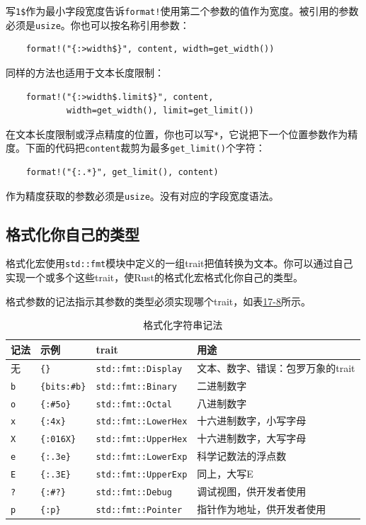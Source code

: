 写\texttt{1\$}作为最小字段宽度告诉\texttt{format!}使用第二个参数的值作为宽度。被引用的参数必须是\texttt{usize}。你也可以按名称引用参数：
\begin{verbatim}
    format!("{:>width$}", content, width=get_width())
\end{verbatim}

同样的方法也适用于文本长度限制：
\begin{verbatim}
    format!("{:>width$.limit$}", content,
            width=get_width(), limit=get_limit())
\end{verbatim}

在文本长度限制或浮点精度的位置，你也可以写\texttt{*}，它说把下一个位置参数作为精度。下面的代码把\texttt{content}裁剪为最多\texttt{get\_limit()}个字符：
\begin{verbatim}
    format!("{:.*}", get_limit(), content)
\end{verbatim}

作为精度获取的参数必须是\texttt{usize}。没有对应的字段宽度语法。

\subsection{格式化你自己的类型}\label{FmtOwnTypes}

格式化宏使用\texttt{std::fmt}模块中定义的一组trait把值转换为文本。你可以通过自己实现一个或多个这些trait，使Rust的格式化宏格式化你自己的类型。

格式参数的记法指示其参数的类型必须实现哪个trait，如表\hyperref[t17-8]{17-8}所示。

\begin{longtable}{p{}p{}p{}p{}}
    \caption{格式化字符串记法}
    \label{t17-8}\\
    \hline
    \textbf{记法} & \textbf{示例} & \textbf{trait} & \textbf{用途} \\
    \hline
    无 & \texttt{\{\}} & \texttt{std::fmt::Display} & 文本、数字、错误：包罗万象的trait \\
    \rowcolor{tablecolor}
    \texttt{b} & \texttt{\{bits:\#b\}} & \texttt{std::fmt::Binary} & 二进制数字 \\
    \texttt{o} & \texttt{\{:\#5o\}} & \texttt{std::fmt::Octal} & 八进制数字 \\
    \rowcolor{tablecolor}
    \texttt{x} & \texttt{\{:4x\}} & \texttt{std::fmt::LowerHex} & 十六进制数字，小写字母 \\
    \texttt{X} & \texttt{\{:016X\}} & \texttt{std::fmt::UpperHex} & 十六进制数字，大写字母 \\
    \rowcolor{tablecolor}
    \texttt{e} & \texttt{\{:.3e\}} & \texttt{std::fmt::LowerExp} & 科学记数法的浮点数 \\
    \texttt{E} & \texttt{\{:.3E\}} & \texttt{std::fmt::UpperExp} & 同上，大写E \\
    \rowcolor{tablecolor}
    \texttt{?} & \texttt{\{:\#?\}} & \texttt{std::fmt::Debug} & 调试视图，供开发者使用 \\
    \texttt{p} & \texttt{\{:p\}} & \texttt{std::fmt::Pointer} & 指针作为地址，供开发者使用 \\
    \hline
\end{longtable}

